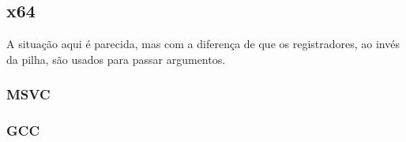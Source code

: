 \subsection{x64}

A situação aqui é parecida, mas com a diferença de que os registradores, ao invés da pilha, são usados para passar argumentos.

\subsubsection{MSVC}



\subsubsection{GCC}


